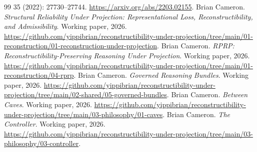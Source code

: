 \documentclass[11pt]{article}
\begin{document}
\begin{thebibliography}{99}
35 (2022): 27730--27744.
\url{https://arxiv.org/abs/2203.02155}.
Brian Cameron. \emph{Structural Reliability Under Projection:
Representational Loss, Reconstructibility, and Admissibility}.
Working paper, 2026.
\url{https://github.com/yippibrian/reconstructibility-under-projection/tree/main/01-reconstruction/01-reconstruction-under-projection}.
Brian Cameron. \emph{RPRP: Reconstructibility-Preserving Reasoning Under Projection}.
Working paper, 2026.
\url{https://github.com/yippibrian/reconstructibility-under-projection/tree/main/01-reconstruction/04-rprp}.
Brian Cameron. \emph{Governed Reasoning Bundles}.
Working paper, 2026.
\url{https://github.com/yippibrian/reconstructibility-under-projection/tree/main/02-shared/05-governed-bundles}.
Brian Cameron. \emph{Between Caves}.
Working paper, 2026.
\url{https://github.com/yippibrian/reconstructibility-under-projection/tree/main/03-philosophy/01-caves}.
Brian Cameron. \emph{The Controller}.
Working paper, 2026.
\url{https://github.com/yippibrian/reconstructibility-under-projection/tree/main/03-philosophy/03-controller}.
\end{thebibliography}
\end{document}
